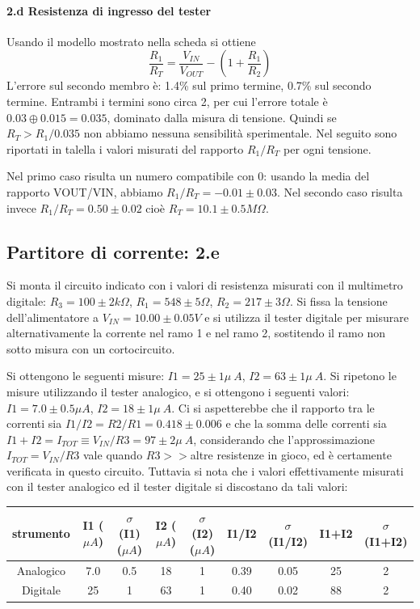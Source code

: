 \documentclass[10pt,a4paper]{article}
\begin{document}
\paragraph{2.d Resistenza di ingresso del tester}

 Usando il modello mostrato nella scheda si ottiene
\[ \frac{R_1}{R_T} =  \frac{V_{IN}}{V_{OUT}} - (1 +  \frac{R_1}{R_2} )
\]
L'errore sul secondo membro \`e: 1.4\% sul primo termine, 0.7\% sul secondo termine. Entrambi i termini sono circa 2, per cui l'errore totale \`e $ 0.03 \oplus 0.015 = 0.035$, dominato dalla misura di tensione. Quindi se  $R_T > R_1/0.035 $ non abbiamo nessuna sensibilit\`a sperimentale. 
Nel seguito sono riportati in talella i valori misurati del rapporto $R_1/R_T$ per ogni tensione.


Nel primo caso risulta un numero compatibile con 0: usando la media del rapporto VOUT/VIN, abbiamo $R_1/R_T = -0.01 \pm 0.03 $.
Nel secondo caso risulta invece $R_1/R_T =0.50 \pm 0.02 $ cio\`e $ R_T = 10.1 \pm 0.5 M\Omega$.

\subsection{Partitore di corrente: 2.e}

Si monta il circuito indicato con i valori di resistenza misurati con il multimetro digitale: 
$R_3= 100\pm 2 k\Omega$, $R_1 = 548\pm 5 \Omega$, $R_2 = 217\pm 3 \Omega$.
Si fissa la tensione dell'alimentatore a $V_{IN}=10.00 \pm 0.05 V$ e si utilizza il tester digitale per misurare alternativamente la corrente nel ramo 1 e nel ramo 2, sostitendo il ramo non sotto misura con un cortocircuito. 


Si ottengono le seguenti misure: $I1 = 25 \pm 1 \mu ~A $, $I2 = 63 \pm 1 \mu ~A $. 
Si ripetono le misure utilizzando il tester analogico, e si ottengono i seguenti valori:
$I1 = 7.0 \pm 0.5 \mu A $, $I2 = 18 \pm 1 \mu ~A $. 
Ci si aspetterebbe che il rapporto tra le correnti sia $I1/I2 = R2/R1 = 0.418 \pm 0.006$ e che la somma delle correnti sia $I1 + I2 = I_{TOT} \equiv V_{IN}/R3 = 97 \pm 2 \mu~A$, considerando che l'approssimazione $I_{TOT}=V_{IN}/R3$ vale quando $R3>>$altre resistenze in gioco, ed \`e certamente verificata in questo circuito. 
Tuttavia si nota che i valori effettivamente misurati con il tester analogico ed il tester digitale si discostano da tali valori:

\begin{center}
\begin{tabular}{|c|c|c|c|c|c|c|c|c|}
\hline 
strumento& I1 ($\mu A$)& $\sigma$(I1) ($\mu A$) & I2	($\mu A$) & $\sigma$(I2) ($\mu A$) & I1/I2 
& $\sigma$(I1/I2) & I1+I2 & $\sigma$(I1+I2) \\
\hline 
Analogico & 7.0 & 0.5  & 18 & 1 & 0.39 & 0.05 & 25 & 2 \\
Digitale & 25 & 1  & 63 & 1 & 0.40 & 0.02 & 88 & 2 \\
\hline 
\end{tabular} 
\end{center}
\end{document}
